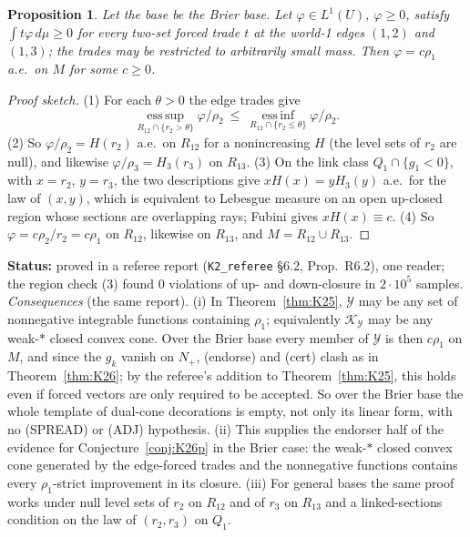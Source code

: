\documentclass[11pt]{article}
\newtheorem{proposition}[theorem]{Proposition}
\theoremstyle{definition}
\theoremstyle{remark}
\newcommand{\src}[1]{\texttt{#1}}
\newcommand{\status}[1]{\par\smallskip\noindent\textbf{Status:} #1\par\smallskip}
\begin{document}
\begin{proposition}\label{prop:KR62}
Let the base be the Brier base. Let $\varphi\in L^1(U)$, $\varphi\ge0$, satisfy $\int t\varphi\,d\mu\ge0$ for every two-set forced trade $t$ at the world-1 edges $(1,2)$ and $(1,3)$; the trades may be restricted to arbitrarily small mass. Then $\varphi=c\rho_1$ a.e.\ on $M$ for some $c\ge0$.
\end{proposition}
\begin{proof}[Proof sketch]
(1) For each $\theta>0$ the edge trades give
\[
\operatorname*{ess\,sup}_{R_{12}\cap\{r_2>\theta\}}\varphi/\rho_2\ \le\ \operatorname*{ess\,inf}_{R_{12}\cap\{r_2\le\theta\}}\varphi/\rho_2 .
\]
(2) So $\varphi/\rho_2=H(r_2)$ a.e.\ on $R_{12}$ for a nonincreasing $H$ (the level sets of $r_2$ are null), and likewise $\varphi/\rho_3=H_3(r_3)$ on $R_{13}$. (3) On the link class $Q_1\cap\{g_1<0\}$, with $x=r_2$, $y=r_3$, the two descriptions give $xH(x)=yH_3(y)$ a.e.\ for the law of $(x,y)$, which is equivalent to Lebesgue measure on an open up-closed region whose sections are overlapping rays; Fubini gives $xH(x)\equiv c$. (4) So $\varphi=c\rho_2/r_2=c\rho_1$ on $R_{12}$, likewise on $R_{13}$, and $M=R_{12}\cup R_{13}$.
\end{proof}
\status{proved in a referee report (\src{K2\_referee} \S6.2, Prop.~R6.2), one reader; the region check (3) found 0 violations of up- and down-closure in $2\cdot10^5$ samples. \emph{Consequences} (the same report). (i) In Theorem~\ref{thm:K25}, $\mathcal Y$ may be any set of nonnegative integrable functions containing $\rho_1$; equivalently $\mathcal K_{\mathcal Y}$ may be any weak-$*$ closed convex cone. Over the Brier base every member of $\mathcal Y$ is then $c\rho_1$ on $M$, and since the $g_k$ vanish on $N_+$, (endorse) and (cert) clash as in Theorem~\ref{thm:K26}; by the referee's addition to Theorem~\ref{thm:K25}, this holds even if forced vectors are only required to be accepted. So over the Brier base the whole template of dual-cone decorations is empty, not only its linear form, with no (SPREAD) or (ADJ) hypothesis. (ii) This supplies the endorser half of the evidence for Conjecture~\ref{conj:K26p} in the Brier case: the weak-$*$ closed convex cone generated by the edge-forced trades and the nonnegative functions contains every $\rho_1$-strict improvement in its closure. (iii) For general bases the same proof works under null level sets of $r_2$ on $R_{12}$ and of $r_3$ on $R_{13}$ and a linked-sections condition on the law of $(r_2,r_3)$ on $Q_1$.}
\end{document}

